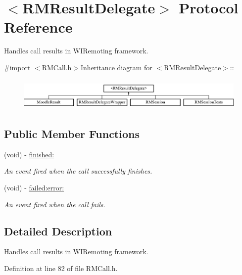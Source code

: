 \hypertarget{protocol_r_m_result_delegate-p}{
\section{$<$RMResultDelegate$>$ Protocol Reference}
\label{protocol_r_m_result_delegate-p}
}


Handles call results in WIRemoting framework.  


{\ttfamily \#import $<$RMCall.h$>$}Inheritance diagram for $<$RMResultDelegate$>$::\begin{figure}[H]
\begin{center}
\leavevmode
\includegraphics[height=1.62791cm]{protocol_r_m_result_delegate-p}
\end{center}
\end{figure}
\subsection*{Public Member Functions}
\begin{DoxyCompactItemize}
\item 
(void) -\/ \hyperlink{protocol_r_m_result_delegate-p_a965fe7cc4e150bb6ecf7cbb02b9c7248}{finished:}
\begin{DoxyCompactList}\small\item\em An event fired when the call successfully finishes. \item\end{DoxyCompactList}\item 
(void) -\/ \hyperlink{protocol_r_m_result_delegate-p_a3521cd9555449b32aabdb759d2dadce5}{failed:error:}
\begin{DoxyCompactList}\small\item\em An event fired when the call fails. \item\end{DoxyCompactList}\end{DoxyCompactItemize}


\subsection{Detailed Description}
Handles call results in WIRemoting framework. 

Definition at line 82 of file RMCall.h.

